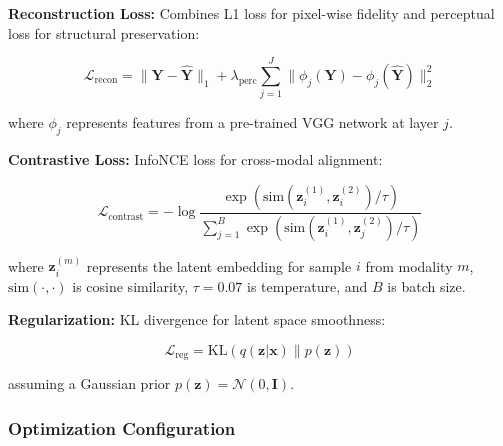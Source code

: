 \documentclass[12pt,a4paper]{article}
\begin{document}
\textbf{Reconstruction Loss:} Combines L1 loss for pixel-wise fidelity and perceptual loss for structural preservation:

\begin{equation}
\mathcal{L}_{\text{recon}} = \|\mathbf{Y} - \hat{\mathbf{Y}}\|_1 + \lambda_{\text{perc}} \sum_{j=1}^{J} \|\phi_j(\mathbf{Y}) - \phi_j(\hat{\mathbf{Y}})\|_2^2
\end{equation}

where $\phi_j$ represents features from a pre-trained VGG network at layer $j$.

\textbf{Contrastive Loss:} InfoNCE loss for cross-modal alignment:

\begin{equation}
\mathcal{L}_{\text{contrast}} = -\log \frac{\exp(\text{sim}(\mathbf{z}_i^{(1)}, \mathbf{z}_i^{(2)}) / \tau)}{\sum_{j=1}^{B} \exp(\text{sim}(\mathbf{z}_i^{(1)}, \mathbf{z}_j^{(2)}) / \tau)}
\end{equation}

where $\mathbf{z}_i^{(m)}$ represents the latent embedding for sample $i$ from modality $m$, $\text{sim}(\cdot, \cdot)$ is cosine similarity, $\tau=0.07$ is temperature, and $B$ is batch size.

\textbf{Regularization:} KL divergence for latent space smoothness:

\begin{equation}
\mathcal{L}_{\text{reg}} = \text{KL}(q(\mathbf{z}|\mathbf{x}) \| p(\mathbf{z}))
\end{equation}

assuming a Gaussian prior $p(\mathbf{z}) = \mathcal{N}(0, \mathbf{I})$.

\subsubsection{Optimization Configuration}
\end{document}
